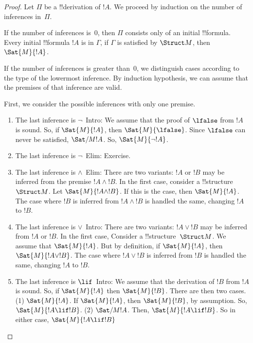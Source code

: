 \documentclass[../../include/open-logic-section]{subfiles}
\begin{document}
\begin{proof}
Let $\Pi$ be a !!{derivation} of $!A$. We proceed by
induction on the number of inferences in~$\Pi$.

If the number of inferences is~0, then $\Pi$ consists only of an
initial !!{formula}. Every initial !!{formula} $!A$ is in $\Gamma$,
if $\Gamma$ is satisfied by $\Struct M$, then $\Sat{M}{!A}$.

If the number of inferences is greater than~0, we distinguish cases
according to the type of the lowermost inference. By induction
hypothesis, we can assume that the premises of that inference are
valid.

First, we consider the possible inferences with only one premise.

\begin{enumerate}
\item The last inference is $\lnot$~Intro: We assume that the proof
of $\lfalse$ from $!A$ is sound. So, if $\Sat{M}{!A}$, then $\Sat{M}
{\lfalse}$. Since $\lfalse$ can never be satisfied, $\Sat/{M}{!A}$.
So, $\Sat{M}{\lnot !A}$.
  
\item The last inference is $\lnot$~Elim: Exercise.

\item The last inference is $\land$~Elim: There are two variants: $!A$ or $!B$
  may be inferred from the premise $!A \land !B$.  In the first case,
  consider a !!{structure}~$\Struct M$. Let $\Sat{M}{!A \land !B}$. If this
  is the case, then $\Sat{M}{!A}$. The case where $!B$ is inferred from $!A 
  \land !B$ is handled the same, changing $!A$ to $!B$.
  
\item The last inference is $\lor$~Intro: There are two variants: $!A
  \lor !B$ may be inferred from $!A$ or $!B$. In the first case,
  Consider a !!{structure}~$\Struct M$. We assume that $\Sat{M}
  {!A}$. But by definition, if $\Sat{M}{!A}$, then $\Sat{M}{!A \lor !B}$.
  The case where $!A \lor !B$ is inferred from $!B$ is
  handled the same, changing $!A$ to $!B$.
  
\item The last inference is $\lif$~Intro: We assume that the derivation
  of $!B$ from $!A$ is sound. So, if $\Sat{M}{!A}$ then $\Sat{M}{!B}$.
  There are then two cases. (1) $\Sat{M}{!A}$. If $\Sat{M}{!A}$, then 
  $\Sat{M}{!B}$, by assumption. So, $\Sat{M}{!A \lif !B}$. (2) $\Sat/{M}
  {!A}$. Then, $\Sat{M}{!A \lif !B}$. So in either case, $\Sat{M}{!A \lif !B}$
  

\end{enumerate}
\end{proof}
\end{document}
